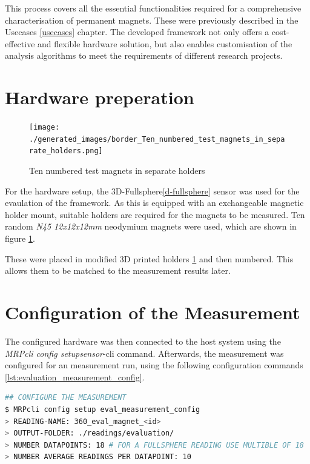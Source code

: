 This process covers all the essential functionalities required for a
comprehensive characterisation of permanent magnets. These were
previously described in the Usecases \ref{usecases} chapter. The
developed framework not only offers a cost-effective and flexible
hardware solution, but also enables customisation of the analysis
algorithms to meet the requirements of different research projects.

\hypertarget{hardware-preperation}{%
\section{Hardware preperation}\label{hardware-preperation}}

\begin{figure}
\centering
\texttt{[image: ./generated\_images/border\_Ten\_numbered\_test\_magnets\_in\_separate\_holders.png]}
\caption{Ten numbered test magnets in separate holders
\label{Ten_numbered_test_magnets_in_separate_holders.png}}
\end{figure}

For the hardware setup, the 3D-Fullsphere\ref{d-fullsphere} sensor was
used for the evaulation of the framework. As this is equipped with an
exchangeable magnetic holder mount, suitable holders are required for
the magnets to be measured. Ten random \emph{N45 12x12x12mm} neodymium
magnets were used, which are shown in figure
\ref{Ten_numbered_test_magnets_in_separate_holders.png}.

These were placed in modified 3D printed holders
\ref{Ten_numbered_test_magnets_in_separate_holders.png} and then
numbered. This allows them to be matched to the measurement results
later.

\hypertarget{configuration-of-the-measurement}{%
\section{Configuration of the
Measurement}\label{configuration-of-the-measurement}}

The configured hardware was then connected to the host system using the
\emph{MRPcli config setupsensor}-\gls{cli} command. Afterwards, the
measurement was configured for an measurement run, using the following
configuration commands \ref{lst:evaluation_measurement_config}.

\newpage

\begin{lstlisting}[language=bash, caption={Measurement configuration for evaluation measurement}, label=lst:evaluation_measurement_config]
## CONFIGURE THE MEASUREMENT
$ MRPcli config setup eval_measurement_config
> READING-NAME: 360_eval_magnet_<id>
> OUTPUT-FOLDER: ./readings/evaluation/ 
> NUMBER DATAPOINTS: 18 # FOR A FULLSPHERE READING USE MULTIBLE OF 18
> NUMBER AVERAGE READINGS PER DATAPOINT: 10
\end{lstlisting}

